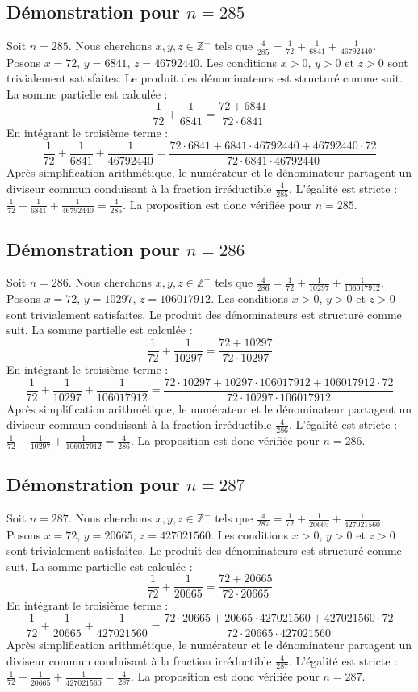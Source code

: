 \documentclass[11pt,a4paper]{article}
\begin{document}
\subsection{Démonstration pour $n = 285$}
Soit $n = 285$. Nous cherchons $x, y, z \in \mathbb{Z}^{+}$ tels que $\frac{4}{285} = \frac{1}{72} + \frac{1}{6841} + \frac{1}{46792440}$.
Posons $x = 72$, $y = 6841$, $z = 46792440$.
Les conditions $x > 0$, $y > 0$ et $z > 0$ sont trivialement satisfaites.
Le produit des dénominateurs est structuré comme suit. La somme partielle est calculée :
$$ \frac{1}{72} + \frac{1}{6841} = \frac{72+6841}{72 \cdot 6841} $$
En intégrant le troisième terme :
$$ \frac{1}{72} + \frac{1}{6841} + \frac{1}{46792440} = \frac{72 \cdot 6841 + 6841 \cdot 46792440 + 46792440 \cdot 72}{72 \cdot 6841 \cdot 46792440} $$
Après simplification arithmétique, le numérateur et le dénominateur partagent un diviseur commun conduisant à la fraction irréductible $\frac{4}{285}$.
L'égalité est stricte : $\frac{1}{72} + \frac{1}{6841} + \frac{1}{46792440} = \frac{4}{285}$.
La proposition est donc vérifiée pour $n = 285$.
\subsection{Démonstration pour $n = 286$}
Soit $n = 286$. Nous cherchons $x, y, z \in \mathbb{Z}^{+}$ tels que $\frac{4}{286} = \frac{1}{72} + \frac{1}{10297} + \frac{1}{106017912}$.
Posons $x = 72$, $y = 10297$, $z = 106017912$.
Les conditions $x > 0$, $y > 0$ et $z > 0$ sont trivialement satisfaites.
Le produit des dénominateurs est structuré comme suit. La somme partielle est calculée :
$$ \frac{1}{72} + \frac{1}{10297} = \frac{72+10297}{72 \cdot 10297} $$
En intégrant le troisième terme :
$$ \frac{1}{72} + \frac{1}{10297} + \frac{1}{106017912} = \frac{72 \cdot 10297 + 10297 \cdot 106017912 + 106017912 \cdot 72}{72 \cdot 10297 \cdot 106017912} $$
Après simplification arithmétique, le numérateur et le dénominateur partagent un diviseur commun conduisant à la fraction irréductible $\frac{4}{286}$.
L'égalité est stricte : $\frac{1}{72} + \frac{1}{10297} + \frac{1}{106017912} = \frac{4}{286}$.
La proposition est donc vérifiée pour $n = 286$.
\subsection{Démonstration pour $n = 287$}
Soit $n = 287$. Nous cherchons $x, y, z \in \mathbb{Z}^{+}$ tels que $\frac{4}{287} = \frac{1}{72} + \frac{1}{20665} + \frac{1}{427021560}$.
Posons $x = 72$, $y = 20665$, $z = 427021560$.
Les conditions $x > 0$, $y > 0$ et $z > 0$ sont trivialement satisfaites.
Le produit des dénominateurs est structuré comme suit. La somme partielle est calculée :
$$ \frac{1}{72} + \frac{1}{20665} = \frac{72+20665}{72 \cdot 20665} $$
En intégrant le troisième terme :
$$ \frac{1}{72} + \frac{1}{20665} + \frac{1}{427021560} = \frac{72 \cdot 20665 + 20665 \cdot 427021560 + 427021560 \cdot 72}{72 \cdot 20665 \cdot 427021560} $$
Après simplification arithmétique, le numérateur et le dénominateur partagent un diviseur commun conduisant à la fraction irréductible $\frac{4}{287}$.
L'égalité est stricte : $\frac{1}{72} + \frac{1}{20665} + \frac{1}{427021560} = \frac{4}{287}$.
La proposition est donc vérifiée pour $n = 287$.
\end{document}
